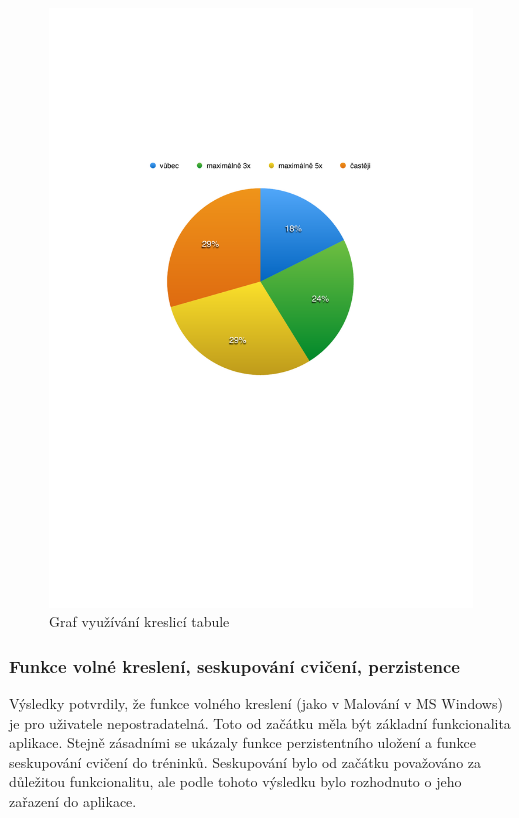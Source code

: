 \documentclass[thesis=B,czech]{FITthesis}[2012/06/26]
\begin{document}
	\begin{figure}
		\includegraphics{img/graph_table_usage}
		\caption{Graf využívání kreslicí tabule}\label{graph:table_usage}
	\end{figure}

\subsubsection{Funkce volné kreslení, seskupování cvičení, perzistence}

	Výsledky potvrdily, že funkce volného kreslení (jako v Malování v MS Windows) je pro uživatele nepostradatelná. Toto od začátku měla být základní funkcionalita aplikace. Stejně zásadními se ukázaly funkce perzistentního uložení a funkce seskupování cvičení do tréninků. Seskupování bylo od začátku považováno za důležitou funkcionalitu, ale podle tohoto výsledku bylo rozhodnuto o jeho zařazení do aplikace.
\end{document}
